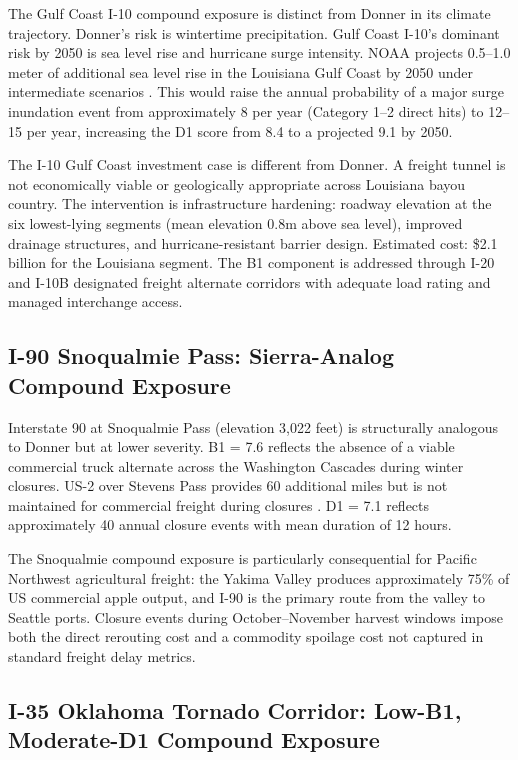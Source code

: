 The Gulf Coast I-10 compound exposure is distinct from Donner in its climate trajectory. Donner's risk is wintertime precipitation. Gulf Coast I-10's dominant risk by 2050 is sea level rise and hurricane surge intensity. NOAA projects 0.5--1.0 meter of additional sea level rise in the Louisiana Gulf Coast by 2050 under intermediate scenarios \citep{NOAA_SLR2022}. This would raise the annual probability of a major surge inundation event from approximately 8 per year (Category 1--2 direct hits) to 12--15 per year, increasing the D1 score from 8.4 to a projected 9.1 by 2050.

The I-10 Gulf Coast investment case is different from Donner. A freight tunnel is not economically viable or geologically appropriate across Louisiana bayou country. The intervention is infrastructure hardening: roadway elevation at the six lowest-lying segments (mean elevation 0.8m above sea level), improved drainage structures, and hurricane-resistant barrier design. Estimated cost: \$2.1 billion for the Louisiana segment. The B1 component is addressed through I-20 and I-10B designated freight alternate corridors with adequate load rating and managed interchange access.

\subsection{I-90 Snoqualmie Pass: Sierra-Analog Compound Exposure}

Interstate 90 at Snoqualmie Pass (elevation 3,022 feet) is structurally analogous to Donner but at lower severity. B1 = 7.6 reflects the absence of a viable commercial truck alternate across the Washington Cascades during winter closures. US-2 over Stevens Pass provides 60 additional miles but is not maintained for commercial freight during closures \citep{WSDOT2023}. D1 = 7.1 reflects approximately 40 annual closure events with mean duration of 12 hours.

The Snoqualmie compound exposure is particularly consequential for Pacific Northwest agricultural freight: the Yakima Valley produces approximately 75\% of US commercial apple output, and I-90 is the primary route from the valley to Seattle ports. Closure events during October--November harvest windows impose both the direct rerouting cost and a commodity spoilage cost not captured in standard freight delay metrics.

\subsection{I-35 Oklahoma Tornado Corridor: Low-B1, Moderate-D1 Compound Exposure}

